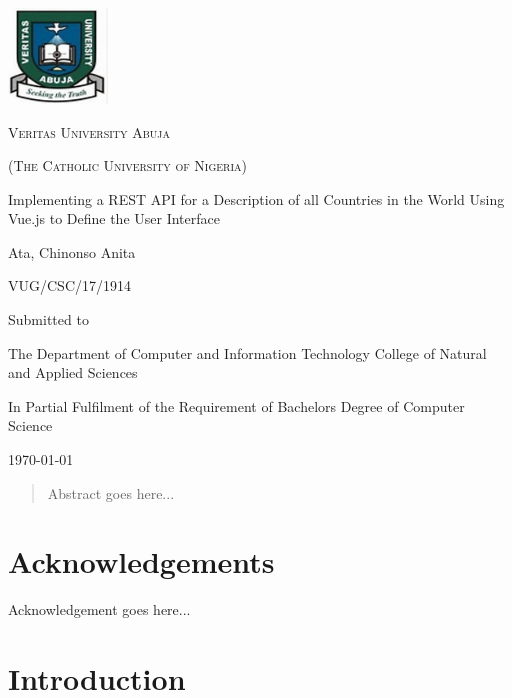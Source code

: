 \documentclass[twoside, a4paper, 12pt]{report}
\begin{document}
\begin{titlepage}
	\centering
	\includegraphics[width=0.2\textwidth]{VeritasUniversityLogo}\par\vspace{1cm}
	{\scshape \LARGE Veritas University Abuja \par}
	{\scshape \Large (The Catholic University of Nigeria) \par}
	\vspace{1cm}
	{\huge Implementing a REST API for a Description of all Countries in the World Using Vue.js to Define the User Interface \par}
	\vspace{1.5cm}
	{\Large Ata, Chinonso Anita \par}
	{\Large VUG/CSC/17/1914 \par}
	\vspace{0.5cm}
	Submitted to \par
	\vspace{0.5cm}
	{\Large The Department of Computer and Information Technology College of Natural and Applied 			Sciences \par}
	\vspace{1cm}
	{\Large In Partial Fulfilment of the Requirement of Bachelors Degree of Computer Science \par}
	\vfill
	{\Large \today \par}
\end{titlepage}

\begin{abstract}
Abstract goes here...
\end{abstract}

\chapter*{Acknowledgements}
Acknowledgement goes here...

\tableofcontents
\listoffigures
\newpage
{}

\onehalfspacing

\chapter{Introduction}
\end{document}
